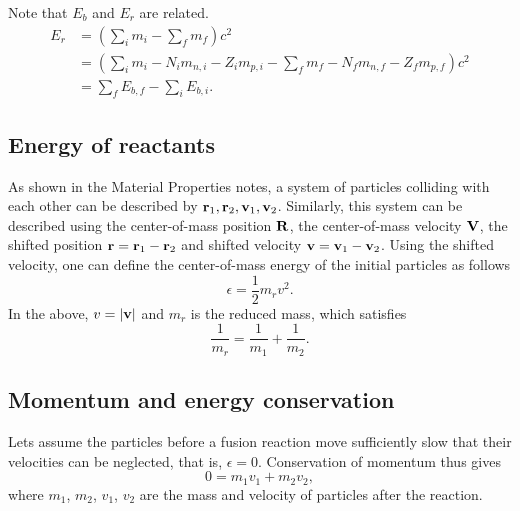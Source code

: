 \documentclass[a4paper,11pt]{report}
\begin{document}
Note that $E_b$ and $E_r$ are related. 
\begin{align}
    E_r &= \left ( \sum_i m_i - \sum_f m_f \right ) c^2 \nonumber \\
    &= \left ( \sum_i m_i - N_i m_{n,i} - Z_i m_{p,i} - \sum_f m_f - N_f m_{n,f} - Z_f m_{p,f}\right ) c^2 \nonumber \\
    &= \sum_f E_{b,f} - \sum_i E_{b,i}.
\end{align}

\subsection{Energy of reactants}
As shown in the Material Properties notes, a system of particles colliding with each other can be described by $\mathbf{r}_1, \mathbf{r}_2, \mathbf{v}_1, \mathbf{v}_2$. Similarly, this system can be described using the center-of-mass position $\mathbf{R}$, the center-of-mass velocity $\mathbf{V}$, the shifted position $\mathbf{r} = \mathbf{r}_1 - \mathbf{r}_2$ and shifted velocity $\mathbf{v} = \mathbf{v}_1 - \mathbf{v}_2$. Using the shifted velocity, one can define the center-of-mass energy of the initial particles as follows
\begin{equation}
    \epsilon = \frac{1}{2} m_r v^2.
\end{equation}
In the above, $v = |\mathbf{v}|$ and $m_r$ is the reduced mass, which satisfies
\begin{equation}
    \frac{1}{m_r} = \frac{1}{m_1} + \frac{1}{m_2}.
\end{equation}

\subsection{Momentum and energy conservation}
Lets assume the particles before a fusion reaction move sufficiently slow that their velocities can be neglected, that is, $\epsilon = 0$. Conservation of momentum thus gives
\begin{equation}
0 = m_1 v_1 + m_2 v_2,
\end{equation}
where $m_1$, $m_2$, $v_1$, $v_2$ are the mass and velocity of particles after the reaction.
\end{document}
